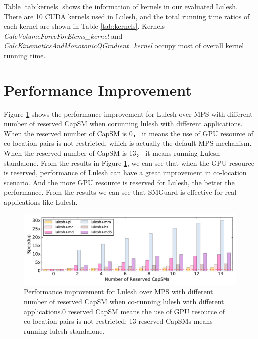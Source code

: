 \documentclass[a4paper,9pt]{article}
\begin{document}
Table \ref{tab:kernels} shows the information of kernels in our evaluated Lulesh. There are 10 CUDA kernels 
used in Lulesh, and the total running time ratios of each kernel are shown in Table \ref{tab:kernels}. Kernels \emph{CalcVolumeForceForElems\_kernel} and \emph{CalcKinematicsAndMonotonicQGradient\_kernel} occupy most of 
overall kernel running time.

\section{Performance Improvement}

Figure \ref{fig:performance_improvement} shows the performance improvement for Lulesh over MPS with different 
number of reserved CapSM when corunning lulesh with different applications. When the reserved number of CapSM 
is 0， it means the use of GPU resource of co-location pairs is not restricted, which is actually the default 
MPS mechanism. When the reserved number of CapSM is 13， it means running Lulesh standalone. From the results 
in Figure \ref{fig:performance_improvement}, we can see that when the GPU resource is reserved, performance 
of Lulesh can have a great improvement in co-location scenario. And the more GPU resource is reserved for 
Lulesh, the better the performance. From the results we can see that SMGuard is effective for real applications 
like Lulesh. 

\begin{figure}[!t]
	\centering
	\includegraphics[width=6.5in]{fig/lulesh_performance_over_mps.pdf}
	\caption{Performance improvement for Lulesh over MPS with different number of reserved CapSM when co-running 
		lulesh with different applications.0 reserved CapSM means the use of GPU resource of co-location pairs 
		is not restricted; 13 reserved CapSMs means running lulesh standalone.}
	\label{fig:performance_improvement}
\end{figure}
\end{document}
